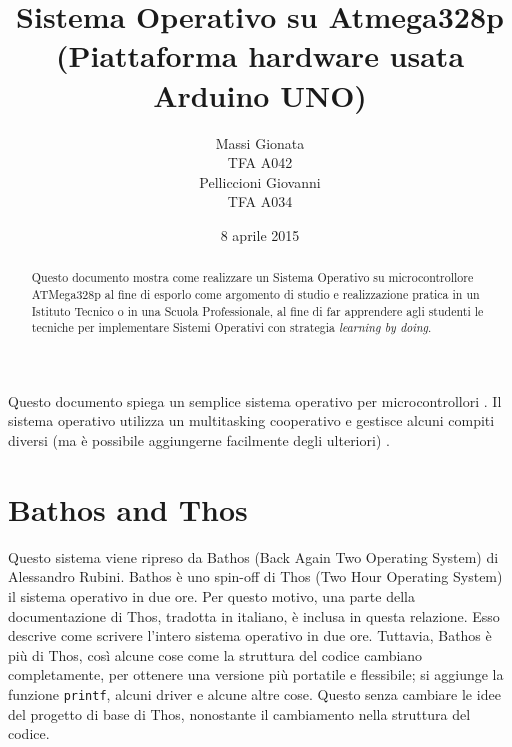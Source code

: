 \documentclass[a4paper,12pt]{report}
\title{Sistema Operativo su Atmega328p (Piattaforma hardware usata Arduino UNO)}
\author{Massi Gionata \\ TFA A042\\Pelliccioni Giovanni\\ TFA A034}
\date{8 aprile 2015}
\begin{document}
\maketitle 
\begin{abstract} 
Questo documento mostra come realizzare un Sistema Operativo su microcontrollore ATMega328p al fine di esporlo come argomento di studio e realizzazione pratica in un Istituto Tecnico o in una Scuola Professionale, al fine di far apprendere agli studenti le tecniche per implementare Sistemi Operativi con strategia \textit{learning by doing}.
\end{abstract} 
 
\tableofcontents %
 








Questo documento spiega un semplice sistema operativo per microcontrollori . Il sistema operativo utilizza un multitasking cooperativo e gestisce alcuni compiti diversi (ma è possibile aggiungerne facilmente degli ulteriori) .
\chapter{Bathos and Thos}

Questo sistema viene ripreso da Bathos (Back Again Two Operating System) di Alessandro Rubini.  Bathos è uno spin-off di Thos (Two Hour Operating System) il sistema operativo in due ore.
Per questo motivo, una parte della documentazione di Thos, tradotta in italiano, è inclusa in questa relazione. Esso descrive come scrivere l'intero sistema operativo in
due ore. Tuttavia, Bathos è più di Thos, così alcune cose come la struttura del codice cambiano completamente, per ottenere una versione più portatile e flessibile; si aggiunge la funzione \texttt{printf}, alcuni driver e alcune altre cose.
Questo senza cambiare le idee del progetto di base di Thos, nonostante il cambiamento nella struttura del codice.
\end{document}
